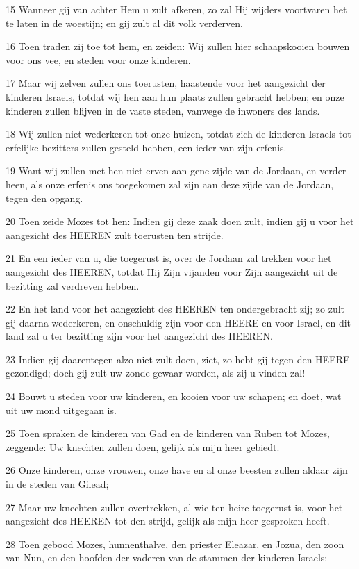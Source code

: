 \par 15 Wanneer gij van achter Hem u zult afkeren, zo zal Hij wijders voortvaren het te laten in de woestijn; en gij zult al dit volk verderven.
\par 16 Toen traden zij toe tot hem, en zeiden: Wij zullen hier schaapskooien bouwen voor ons vee, en steden voor onze kinderen.
\par 17 Maar wij zelven zullen ons toerusten, haastende voor het aangezicht der kinderen Israels, totdat wij hen aan hun plaats zullen gebracht hebben; en onze kinderen zullen blijven in de vaste steden, vanwege de inwoners des lands.
\par 18 Wij zullen niet wederkeren tot onze huizen, totdat zich de kinderen Israels tot erfelijke bezitters zullen gesteld hebben, een ieder van zijn erfenis.
\par 19 Want wij zullen met hen niet erven aan gene zijde van de Jordaan, en verder heen, als onze erfenis ons toegekomen zal zijn aan deze zijde van de Jordaan, tegen den opgang.
\par 20 Toen zeide Mozes tot hen: Indien gij deze zaak doen zult, indien gij u voor het aangezicht des HEEREN zult toerusten ten strijde.
\par 21 En een ieder van u, die toegerust is, over de Jordaan zal trekken voor het aangezicht des HEEREN, totdat Hij Zijn vijanden voor Zijn aangezicht uit de bezitting zal verdreven hebben.
\par 22 En het land voor het aangezicht des HEEREN ten ondergebracht zij; zo zult gij daarna wederkeren, en onschuldig zijn voor den HEERE en voor Israel, en dit land zal u ter bezitting zijn voor het aangezicht des HEEREN.
\par 23 Indien gij daarentegen alzo niet zult doen, ziet, zo hebt gij tegen den HEERE gezondigd; doch gij zult uw zonde gewaar worden, als zij u vinden zal!
\par 24 Bouwt u steden voor uw kinderen, en kooien voor uw schapen; en doet, wat uit uw mond uitgegaan is.
\par 25 Toen spraken de kinderen van Gad en de kinderen van Ruben tot Mozes, zeggende: Uw knechten zullen doen, gelijk als mijn heer gebiedt.
\par 26 Onze kinderen, onze vrouwen, onze have en al onze beesten zullen aldaar zijn in de steden van Gilead;
\par 27 Maar uw knechten zullen overtrekken, al wie ten heire toegerust is, voor het aangezicht des HEEREN tot den strijd, gelijk als mijn heer gesproken heeft.
\par 28 Toen gebood Mozes, hunnenthalve, den priester Eleazar, en Jozua, den zoon van Nun, en den hoofden der vaderen van de stammen der kinderen Israels;

